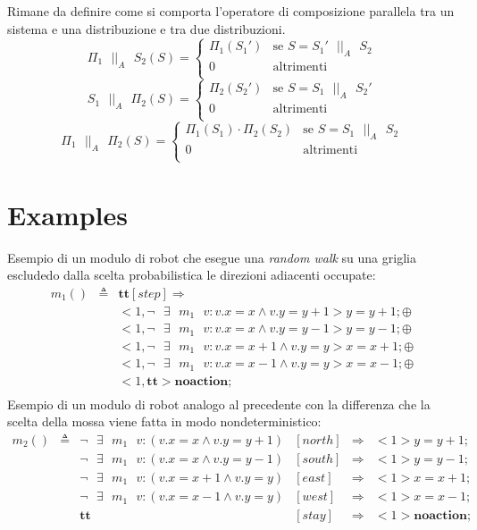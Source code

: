 \documentclass{article}
\newcommand{\Space}{\mbox{ }}
\newcommand{\Par}{\Space||_A\Space}
\begin{document}
Rimane da definire come si comporta l'operatore di composizione parallela tra un sistema e una distribuzione e tra due distribuzioni.
$$
\Pi_1 \Par S_2 (S) = \left\{
\begin{array}{ll}
	\Pi_1(S_1')	& \mbox{se } S = S_1' \Par S_2 \\
	0			& \mbox{altrimenti} \\
\end{array}
\right.
$$
$$
S_1 \Par \Pi_2 (S) = \left\{
\begin{array}{ll}
	\Pi_2(S_2')	& \mbox{se } S = S_1 \Par S_2' \\
	0			& \mbox{altrimenti} \\
\end{array}
\right.
$$
$$
\Pi_1 \Par \Pi_2 (S) = \left\{
\begin{array}{ll}
	\Pi_1(S_1)\cdot\Pi_2(S_2)	& \mbox{se } S = S_1 \Par S_2 \\
	0			& \mbox{altrimenti} \\
\end{array}
\right.
$$


\section{Examples}
Esempio di un modulo di robot che esegue una \emph{random walk} su una griglia escludedo dalla scelta probabilistica le direzioni adiacenti occupate:
$$
\begin{array}{rcl}
m_1 () & \triangleq & \mathbf{tt} [step]\Rightarrow \\ 
	& & <1, \neg \Space \exists \Space m_1 \Space v: v.x=x \wedge v.y=y+1> y=y+1; \oplus \\
	& & <1, \neg \Space \exists \Space m_1 \Space v: v.x=x \wedge v.y=y-1> y=y-1; \oplus \\ 
	& & <1, \neg \Space \exists \Space m_1 \Space v: v.x=x+1 \wedge v.y=y> x=x+1; \oplus \\ 
	& & <1, \neg \Space \exists \Space m_1 \Space v: v.x=x-1 \wedge v.y=y> x=x-1; \oplus \\ 
	& & <1, \mathbf{tt}> \mathbf{noaction};\\ 
\end{array}
$$
Esempio di un modulo di robot analogo al precedente con la differenza che la scelta della mossa viene fatta in modo nondeterministico:
$$
\begin{array}{rcllcl}
m_2 () & \triangleq & \neg \Space \exists \Space m_1 \Space v: (v.x=x \wedge v.y=y+1) &[north]&\Rightarrow& <1> y=y+1; \\ 
	& & \neg \Space \exists \Space m_1 \Space v: (v.x=x \wedge v.y=y-1) &[south]&\Rightarrow& <1> y=y-1; \\ 
	& & \neg \Space \exists \Space m_1 \Space v: (v.x=x+1 \wedge v.y=y) &[east]&\Rightarrow& <1> x=x+1; \\ 
	& & \neg \Space \exists \Space m_1 \Space v: (v.x=x-1 \wedge v.y=y) &[west]&\Rightarrow& <1> x=x-1; \\ 
	& & \mathbf{tt} &[stay]&\Rightarrow& <1> \mathbf{noaction}; \\ 
\end{array}
$$
\end{document}

